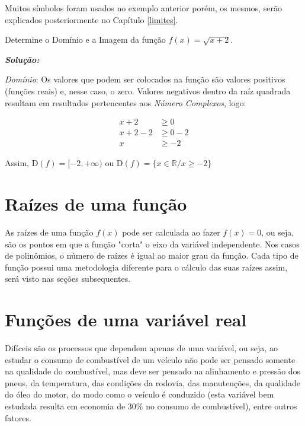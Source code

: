 \vspace{.5cm}
Muitos símbolos foram usados no exemplo anterior porém, os mesmos, serão explicados posteriormente no Capítulo \ref{limites}.

\begin{example}
	Determine o Domínio e a Imagem da função $f(x)=\sqrt{x+2}$.

\vspace{.5cm}
\textit{\textbf{Solução:}}

\textit{Domínio}: Os valores que podem ser colocados na função são valores positivos (funções reais) e, nesse caso, o zero. Valores negativos dentro da raíz quadrada resultam em resultados pertencentes aos \textit{Número Complexos}, logo:

\begin{ceqn}
	\begin{align*}
	x+2 & \geq 0 \\
	x+2-2 &\geq 0-2 \\
	x &\geq -2
	\end{align*}
\end{ceqn}

Assim, $\mathrm{D}(f)=[-2,+\infty)$ ou $\mathrm{D}(f)=\{x \in \mathbb{R}/x \geq -2\}$
\end{example}

\section{Raízes de uma função}

As raízes de uma função $f(x)$ pode ser calculada ao fazer $f(x)=0$, ou seja, são os pontos em que a função "corta" o eixo da variável independente. Nos casos de polinômios, o número de raízes é igual ao maior grau da função.
Cada tipo de função possui uma metodologia diferente para o cálculo das suas raízes assim, será visto nas seções subsequentes.

\section{Funções de uma variável real}

Difíceis são os processos que dependem apenas de uma variável, ou seja, ao estudar o consumo de combustível de um veículo não pode ser pensado somente na qualidade do combustível, mas deve ser pensado na alinhamento e pressão dos pneus, da temperatura, das condições da rodovia, das manutenções, da qualidade do óleo do motor, do modo como o veículo é conduzido (esta variável bem estudada resulta em economia de 30\% no consumo de combustível), entre outros fatores.

